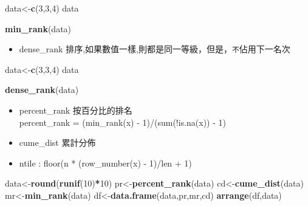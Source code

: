 \documentclass[]{book}
\newenvironment{Shaded}{\begin{snugshade}}{\end{snugshade}}
\newcommand{\KeywordTok}[1]{\textcolor[rgb]{0.13,0.29,0.53}{\textbf{#1}}}
\newcommand{\DecValTok}[1]{\textcolor[rgb]{0.00,0.00,0.81}{#1}}
\newcommand{\OperatorTok}[1]{\textcolor[rgb]{0.81,0.36,0.00}{\textbf{#1}}}
\newcommand{\NormalTok}[1]{#1}
\providecommand{\tightlist}{%
  \setlength{\itemsep}{0pt}\setlength{\parskip}{0pt}}
\theoremstyle{definition}
\theoremstyle{definition}
\theoremstyle{definition}
\theoremstyle{remark}
\begin{document}
\begin{Shaded}
\begin{Highlighting}[]
\NormalTok{data<-}\KeywordTok{c}\NormalTok{(}\DecValTok{3}\NormalTok{,}\DecValTok{3}\NormalTok{,}\DecValTok{4}\NormalTok{)  }
\NormalTok{data}
\end{Highlighting}
\end{Shaded}

\begin{Shaded}
\begin{Highlighting}[]
\KeywordTok{min_rank}\NormalTok{(data)}
\end{Highlighting}
\end{Shaded}

\begin{itemize}
\tightlist
\item
  dense\_rank
  排序,如果數值一樣,則都是同一等級，但是，\texttt{不}佔用下一名次
\end{itemize}

\begin{Shaded}
\begin{Highlighting}[]
\NormalTok{data<-}\KeywordTok{c}\NormalTok{(}\DecValTok{3}\NormalTok{,}\DecValTok{3}\NormalTok{,}\DecValTok{4}\NormalTok{)  }
\NormalTok{data}
\end{Highlighting}
\end{Shaded}

\begin{Shaded}
\begin{Highlighting}[]
\KeywordTok{dense_rank}\NormalTok{(data)}
\end{Highlighting}
\end{Shaded}

\begin{itemize}
\item
  percent\_rank 按百分比的排名\\
  percent\_rank = (min\_rank(x) - 1)/(sum(!is.na(x)) - 1)\\
\item
  cume\_dist 累計分佈
\item
  ntile : floor(n * (row\_number(x) - 1)/len + 1)
\end{itemize}

\begin{Shaded}
\begin{Highlighting}[]
\NormalTok{data<-}\KeywordTok{round}\NormalTok{(}\KeywordTok{runif}\NormalTok{(}\DecValTok{10}\NormalTok{)}\OperatorTok{*}\DecValTok{10}\NormalTok{)}
\NormalTok{pr<-}\KeywordTok{percent_rank}\NormalTok{(data)}
\NormalTok{cd<-}\KeywordTok{cume_dist}\NormalTok{(data)}
\NormalTok{mr<-}\KeywordTok{min_rank}\NormalTok{(data)}
\NormalTok{df<-}\KeywordTok{data.frame}\NormalTok{(data,pr,mr,cd)}
\KeywordTok{arrange}\NormalTok{(df,data)}
\end{Highlighting}
\end{Shaded}
\end{document}
